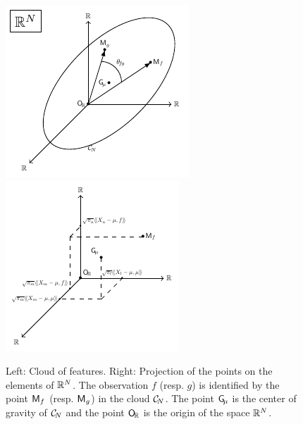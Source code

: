 \begin{figure}
    \centering
    \includegraphics[scale=1.2]{figures/cloud_features.pdf}
    \includegraphics[scale=1.2]{figures/cloud_features_proj.pdf}
    \caption{Left: Cloud of features. Right: Projection of the points on the elements of $\mathbb{R}^N$. The observation $f$ (resp. $g$) is identified by the point $\mathsf{M}_f$ (resp. $\mathsf{M}_g$) in the cloud $\mathcal{C}_{\!N}$. The point $\mathsf{G}_{\!\mu}$ is the center of gravity of $\mathcal{C}_{\!N}$ and the point $\mathsf{O}_{\!\mathbb{R}}$ is the origin of the space $\mathbb{R}^N$.}
    \label{fig:cloud_features}
\end{figure}

